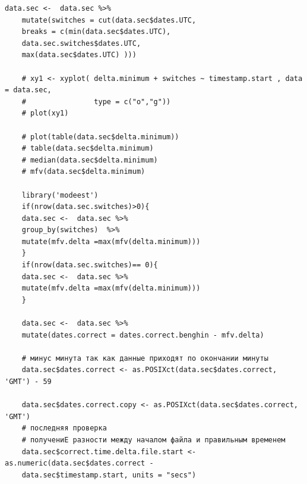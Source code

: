 \documentclass[a4paper,14pt]{extreport}
\begin{document}
\begin{lstlisting}[language={Renhanced}, ]
	data.sec <-  data.sec %>%
	mutate(switches = cut(data.sec$dates.UTC, 
	breaks = c(min(data.sec$dates.UTC),
	data.sec.switches$dates.UTC,
	max(data.sec$dates.UTC) )))
	
	# xy1 <- xyplot( delta.minimum + switches ~ timestamp.start , data = data.sec,
	#                type = c("o","g"))
	# plot(xy1)
	
	# plot(table(data.sec$delta.minimum))
	# table(data.sec$delta.minimum)
	# median(data.sec$delta.minimum)
	# mfv(data.sec$delta.minimum)
	
	library('modeest')
	if(nrow(data.sec.switches)>0){
	data.sec <-  data.sec %>%
	group_by(switches)  %>%
	mutate(mfv.delta =max(mfv(delta.minimum)))
	}
	if(nrow(data.sec.switches)== 0){
	data.sec <-  data.sec %>%
	mutate(mfv.delta =max(mfv(delta.minimum)))
	}
	
	data.sec <-  data.sec %>%
	mutate(dates.correct = dates.correct.benghin - mfv.delta)
	
	# минус минута так как данные приходят по окончании минуты
	data.sec$dates.correct <- as.POSIXct(data.sec$dates.correct, 'GMT') - 59
	
	data.sec$dates.correct.copy <- as.POSIXct(data.sec$dates.correct, 'GMT')
	# последняя проверка
	# получениЕ разности между началом файла и правильным временем
	data.sec$correct.time.delta.file.start <- as.numeric(data.sec$dates.correct - 
	data.sec$timestamp.start, units = "secs")
	\end{lstlisting}
	
	
	
	
	
	
\end{document}
